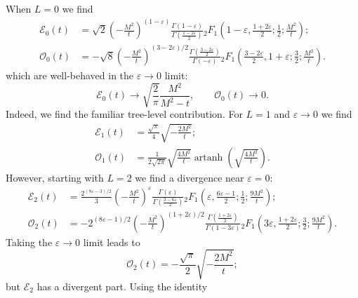 When $L = 0$ we find
\begin{align}
	\mathcal{E}_{0}(t) &= \sqrt{2} \left( - \frac{M^{2}}{t} \right)^{(1-\varepsilon)} \frac{\Gamma\left( 1 - \varepsilon \right)}{\Gamma\left( \frac{1 - 2\varepsilon}{2} \right)} {}_{2} F_{1} \left( 1 - \varepsilon, \frac{1 + 2\varepsilon}{2}; \frac{1}{2}; \frac{M^{2}}{t} \right); \\
	\mathcal{O}_{0}(t) &= -\sqrt{8} \left( - \frac{M^{2}}{t} \right)^{(3 - 2\varepsilon)/2} \frac{\Gamma\left( \frac{3 - 2\varepsilon}{2} \right)}{\Gamma\left( - \varepsilon \right)} {}_{2} F_{1} \left( \frac{3 - 2\varepsilon}{2}, 1 + \varepsilon; \frac{3}{2}; \frac{M^{2}}{t} \right).
\end{align}
which are well-behaved in the $\varepsilon \rightarrow 0$ limit:
\begin{equation}
	\mathcal{E}_{0}(t) \rightarrow \sqrt{\frac{2}{\pi}}\frac{M^{2}}{M^{2} - t}, \qquad
	\mathcal{O}_{0}(t) \rightarrow 0.
\end{equation}
Indeed, we find the familiar tree-level contribution. For $L = 1$ and $\varepsilon \rightarrow 0$ we find
\begin{align}
	\mathcal{E}_{1}(t) &= \frac{\sqrt{\pi}}{4} \sqrt{- \frac{2M^{2}}{t}}; \\
	\mathcal{O}_{1}(t) &= \frac{1}{2\sqrt{2\pi}} \sqrt{\frac{4M^{2}}{t}} \operatorname{artanh}{\left( \sqrt{\frac{4M^{2}}{t}} \right)}.
\end{align}
However, starting with $L = 2$ we find a divergence near $\varepsilon = 0$:
\begin{align}
	\mathcal{E}_{2}(t) &= \frac{2^{(8\varepsilon - 3)/2}}{3} \left( - \frac{M^{2}}{t} \right)^{\varepsilon} \frac{\Gamma\left( \varepsilon \right)}{\Gamma\left( \frac{3 - 6\varepsilon}{2} \right)} {}_{2} F_{1} \left( \varepsilon, \frac{6 \varepsilon - 1}{2}; \frac{1}{2}; \frac{9M^{2}}{t} \right); \\
	\mathcal{O}_{2}(t) &= -2^{(8\varepsilon - 1)/2} \left( - \frac{M^{2}}{t} \right)^{(1 + 2\varepsilon)/2} \frac{\Gamma\left( \frac{1 + 2\varepsilon}{2} \right)}{\Gamma\left( 1 - 3 \varepsilon \right)} {}_{2} F_{1} \left( 3\varepsilon, \frac{1 + 2\varepsilon}{2}; \frac{3}{2}; \frac{9M^{2}}{t} \right).
\end{align}
Taking the $\varepsilon \rightarrow 0$ limit leads to
\begin{equation}
	\mathcal{O}_{2}(t) = - \frac{\sqrt{\pi}}{2} \sqrt{-\frac{2M^{2}}{t}};
\end{equation}
but $\mathcal{E}_{2}$ has a divergent part. Using the identity

